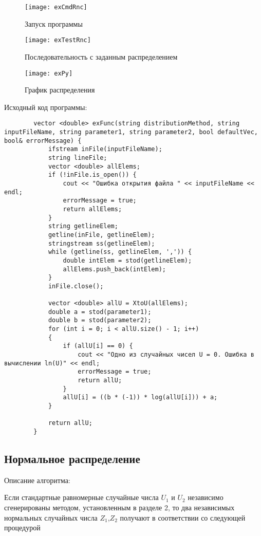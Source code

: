 \documentclass[bachelor, och, coursework]{shiza}
\begin{document}
	\begin{figure}[H]
		\centering
		\texttt{[image: exCmdRnc]}
		\caption{Запуск программы}
		\label{fig:exCmdRnc}
	\end{figure}
	
	\begin{figure}[H]
		\centering
		\texttt{[image: exTestRnc]}
		\caption{Последовательность с заданным распределением}
		\label{fig:exTestRnc}
	\end{figure}
	
	\begin{figure}[H]
		\centering
		\texttt{[image: exPy]}
		\caption{График распределения}
		\label{fig:exPy}
	\end{figure}
	
	Исходный код программы:
	
	\begin{verbatim}
		vector <double> exFunc(string distributionMethod, string inputFileName, string parameter1, string parameter2, bool defaultVec, bool& errorMessage) {
			ifstream inFile(inputFileName);
			string lineFile;
			vector <double> allElems;
			if (!inFile.is_open()) {
				cout << "Ошибка открытия файла " << inputFileName << endl;
				errorMessage = true;
				return allElems;
			}
			string getlineElem;
			getline(inFile, getlineElem);
			stringstream ss(getlineElem);
			while (getline(ss, getlineElem, ',')) {
				double intElem = stod(getlineElem);
				allElems.push_back(intElem);
			}
			inFile.close();
			
			vector <double> allU = XtoU(allElems);
			double a = stod(parameter1);
			double b = stod(parameter2);
			for (int i = 0; i < allU.size() - 1; i++)
			{
				if (allU[i] == 0) {
					cout << "Одно из случайных чисел U = 0. Ошибка в вычислении ln(U)" << endl;
					errorMessage = true;
					return allU;
				}
				allU[i] = ((b * (-1)) * log(allU[i])) + a;
			}
			
			return allU;
		}
	\end{verbatim}

	
	\subsection{Нормальное распределение}

	Описание алгоритма:

	Если стандартные равномерные случайные числа $U_1$ и $U_2$ независимо сгенерированы методом, установленным в разделе 2, то два независимых нормальных случайных числа $Z_1$,$Z_2$ получают в соответствии со следующей процедурой
	
\end{document}
